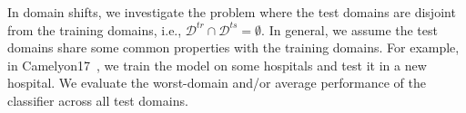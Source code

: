 In domain shifts, we investigate the problem where the test domains are disjoint from the training domains, i.e., $\mathcal{D}^{tr} \cap \mathcal{D}^{ts} = \emptyset$. In general, we assume the test domains share some common properties with the training domains. For example, in Camelyon17~\citep{koh2021wilds}, we train the model on some hospitals and test it in a new hospital. We evaluate the worst-domain and/or average performance of the classifier across all test domains.
